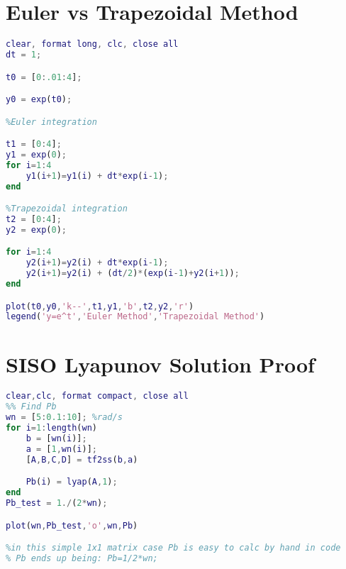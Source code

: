 
\section{Euler vs Trapezoidal Method}
\begin{lstlisting}[language=matlab]
clear, format long, clc, close all
dt = 1;

t0 = [0:.01:4];

y0 = exp(t0);

%Euler integration

t1 = [0:4];
y1 = exp(0);
for i=1:4
    y1(i+1)=y1(i) + dt*exp(i-1);
end

%Trapezoidal integration
t2 = [0:4];
y2 = exp(0);

for i=1:4
    y2(i+1)=y2(i) + dt*exp(i-1);
    y2(i+1)=y2(i) + (dt/2)*(exp(i-1)+y2(i+1));
end

plot(t0,y0,'k--',t1,y1,'b',t2,y2,'r')
legend('y=e^t','Euler Method','Trapezoidal Method')
\end{lstlisting}

\section{SISO Lyapunov Solution Proof}
\begin{lstlisting}[language=matlab]
clear,clc, format compact, close all
%% Find Pb
wn = [5:0.1:10]; %rad/s
for i=1:length(wn)
    b = [wn(i)];
    a = [1,wn(i)];
    [A,B,C,D] = tf2ss(b,a)

    Pb(i) = lyap(A,1);
end
Pb_test = 1./(2*wn);

plot(wn,Pb_test,'o',wn,Pb)

%in this simple 1x1 matrix case Pb is easy to calc by hand in code
% Pb ends up being: Pb=1/2*wn;
\end{lstlisting}

